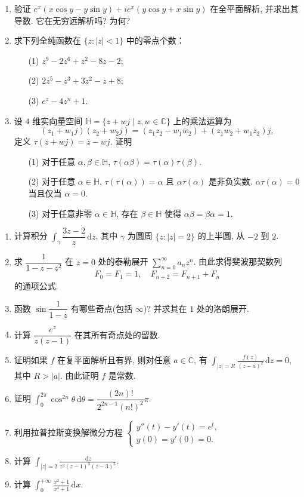 \documentclass[simple]{hfutexam}
\newcommand{\diff}{\,\mathrm{d}}
\newcommand\BC{\mathbb{C}}
\newcommand\BH{\mathbb{H}}
\newcommand\ov[1]{\overline{#1}}
\begin{document}
\begin{enumerate}
\item 验证 $e^x(x\cos y-y\sin y)+i e^x(y\cos y+x\sin y)$ 在全平面解析, 并求出其导数. 它在无穷远解析吗? 为何?
\item 求下列全纯函数在 $\{z:|z|<1\}$ 中的零点个数：
\begin{enumerate}
\item[(1)] $z^9-2z^6+z^2-8z-2$;
\item[(2)] $2z^5-z^3+3z^2-z+8$;
\item[(3)] $e^z-4z^n+1$.
\end{enumerate}
\item 设 $4$ 维实向量空间 $\BH=\{z+wj\mid z,w\in\BC\}$ 上的乘法运算为
  \[(z_1+w_1j)(z_2+w_2j)=(z_1z_2-w_1\ov w_2)+(z_1w_2+w_1\ov z_2)j,\]
定义 $\tau(z+wj)=\ov z-wj$.
证明
\begin{enumerate}
\item[(1)] 对于任意 $\alpha,\beta\in\BH$, $\tau(\alpha \beta)=\tau(\alpha)\tau(\beta)$.
\item[(2)] 对于任意 $\alpha\in\BH$, $\tau(\tau(\alpha))=\alpha$ 且 $\alpha\tau(\alpha)$ 是非负实数. $\alpha\tau(\alpha)=0$ 当且仅当 $\alpha=0$. 
\item[(3)] 对于任意非零 $\alpha\in\BH$, 存在 $\beta\in\BH$ 使得 $\alpha\beta=\beta\alpha=1$. 
\end{enumerate}
\end{enumerate}


\begin{enumerate}
\item 计算积分 $\displaystyle\int_\gamma\dfrac{3z-2}{z}\diff z$, 其中 $\gamma$ 为圆周 $\{z: |z|=2\}$ 的上半圆, 从 $-2$ 到 $2$.
\item 求 $\dfrac{1}{1-z-z^2}$ 在 $z=0$ 处的泰勒展开 $\displaystyle\sum_{n=0}^\infty a_nz^n$. 由此求得斐波那契数列
  \[F_0=F_1=1,\quad F_{n+2}=F_{n+1}+F_n\]
的通项公式.
\item 函数 $\sin\dfrac{1}{1-z}$ 有哪些奇点(包括 $\infty$)? 并求其在 $1$ 处的洛朗展开.
\item 计算 $\dfrac{e^z}{z(z-1)}$ 在其所有奇点处的留数.
\item 证明如果 $f$ 在复平面解析且有界, 则对任意 $a\in\BC$, 有
  $\displaystyle\int_{|z|=R}\frac{f(z)}{(z-a)^2}\diff z=0$,
其中 $R>|a|$.
由此证明 $f$ 是常数.
\item 证明 $\displaystyle\int_0^{2\pi}\cos^{2n}\theta\diff \theta=\dfrac{(2n)!}{2^{2n-1}(n!)^2}\pi$.
\item 利用拉普拉斯变换解微分方程
$\begin{cases}
	y''(t)-y'(t)=e^t,&\\
	y(0)=y'(0)=0.&
\end{cases}$
\item 计算 $\displaystyle\int_{|z|=2}\frac{\diff z}{z^3(z-1)^3(z-3)^5}$.
\item 计算 $\displaystyle\int_0^{+\infty}\frac{x^2+1}{x^4+1}\diff x$.
\end{enumerate}
\end{document}
